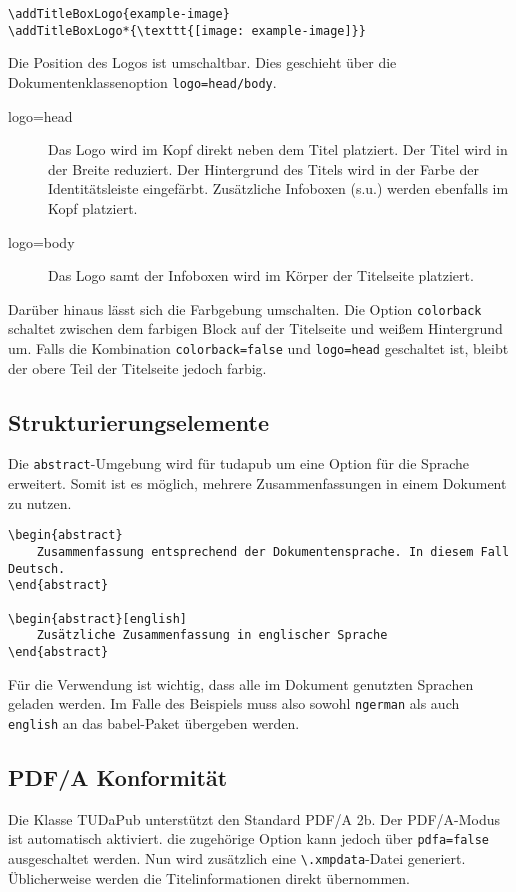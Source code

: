 \documentclass[
	ngerman,
	accentcolor=9c,%
	]{tudapub}
\let\code\texttt
\let\pck\textsf
\let\cls\textsf
\begin{document}
\begin{verbatim}
\addTitleBoxLogo{example-image}
\addTitleBoxLogo*{\texttt{[image: example-image]}}
\end{verbatim}

Die Position des Logos ist umschaltbar. Dies geschieht über die Dokumentenklassenoption \code{logo=head/body}.
\begin{description}
	\item[logo=head] Das Logo wird im Kopf direkt neben dem Titel platziert. Der Titel wird in der Breite reduziert. Der Hintergrund des Titels wird in der Farbe der Identitätsleiste eingefärbt. Zusätzliche Infoboxen (s.u.) werden ebenfalls im Kopf platziert.
	\item[logo=body] Das Logo samt der Infoboxen wird im Körper der Titelseite platziert.
\end{description}

Darüber hinaus lässt sich die Farbgebung umschalten. Die Option \code{colorback} schaltet zwischen dem farbigen Block auf der Titelseite und weißem Hintergrund um. Falls die Kombination \code{colorback=false} und \code{logo=head} geschaltet ist, bleibt der obere Teil der Titelseite jedoch farbig.

\subsection{Strukturierungselemente}
Die \code{abstract}-Umgebung wird für \cls{tudapub} um eine Option für die Sprache erweitert. Somit ist es möglich, mehrere Zusammenfassungen in einem Dokument zu nutzen.

\begin{verbatim}
\begin{abstract}
	Zusammenfassung entsprechend der Dokumentensprache. In diesem Fall Deutsch.
\end{abstract}

\begin{abstract}[english]
	Zusätzliche Zusammenfassung in englischer Sprache
\end{abstract}
\end{verbatim}

Für die Verwendung ist wichtig, dass alle im Dokument genutzten Sprachen geladen werden. Im Falle des Beispiels muss also sowohl \code{ngerman} als auch \code{english} an das \pck{babel}-Paket übergeben werden.


\subsection{PDF/A Konformität}
Die Klasse TUDaPub unterstützt den Standard PDF/A 2b. Der PDF/A-Modus ist automatisch aktiviert. die zugehörige Option kann jedoch über \code{pdfa=false} ausgeschaltet werden.
Nun wird zusätzlich eine \code{\textbackslash.xmpdata}-Datei generiert. Üblicherweise werden die Titelinformationen direkt übernommen.
\end{document}
